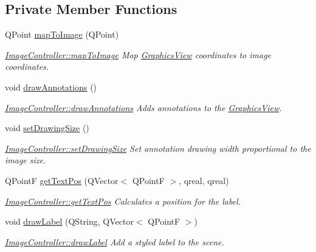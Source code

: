 \subsection*{Private Member Functions}
\begin{DoxyCompactItemize}
\item 
Q\+Point \hyperlink{classImageController_a6f5f89e006b03028200798cc9e550dee}{map\+To\+Image} (Q\+Point)
\begin{DoxyCompactList}\small\item\em \hyperlink{classImageController_a6f5f89e006b03028200798cc9e550dee}{Image\+Controller\+::map\+To\+Image} Map \hyperlink{classGraphicsView}{Graphics\+View} coordinates to image coordinates. \end{DoxyCompactList}\item 
\mbox{\label{classImageController_a7d1362696c9b966724a4f2ac51e44db8}} 
void \hyperlink{classImageController_a7d1362696c9b966724a4f2ac51e44db8}{draw\+Annotations} ()
\begin{DoxyCompactList}\small\item\em \hyperlink{classImageController_a7d1362696c9b966724a4f2ac51e44db8}{Image\+Controller\+::draw\+Annotations} Adds annotations to the \hyperlink{classGraphicsView}{Graphics\+View}. \end{DoxyCompactList}\item 
\mbox{\label{classImageController_ab25fda433092c9b6c758869a34c8813c}} 
void \hyperlink{classImageController_ab25fda433092c9b6c758869a34c8813c}{set\+Drawing\+Size} ()
\begin{DoxyCompactList}\small\item\em \hyperlink{classImageController_ab25fda433092c9b6c758869a34c8813c}{Image\+Controller\+::set\+Drawing\+Size} Set annotation drawing width proportional to the image size. \end{DoxyCompactList}\item 
Q\+PointF \hyperlink{classImageController_aa34adc44b0ff9719cc998bc89d3bf5b0}{get\+Text\+Pos} (Q\+Vector$<$ Q\+PointF $>$, qreal, qreal)
\begin{DoxyCompactList}\small\item\em \hyperlink{classImageController_aa34adc44b0ff9719cc998bc89d3bf5b0}{Image\+Controller\+::get\+Text\+Pos} Calculates a position for the label. \end{DoxyCompactList}\item 
void \hyperlink{classImageController_a4980cd42b6086ec8c4647e0043864b40}{draw\+Label} (Q\+String, Q\+Vector$<$ Q\+PointF $>$)
\begin{DoxyCompactList}\small\item\em \hyperlink{classImageController_a4980cd42b6086ec8c4647e0043864b40}{Image\+Controller\+::draw\+Label} Add a styled label to the scene. \end{DoxyCompactList}\end{DoxyCompactItemize}
